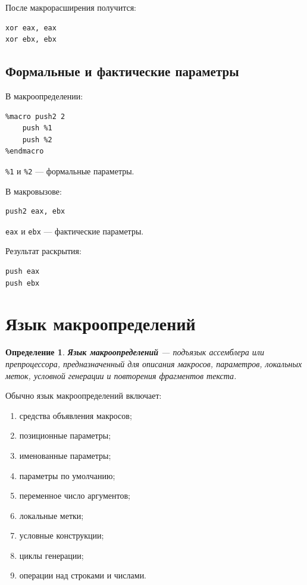 \documentclass[12pt,a4paper]{article}
\newtheorem{definition}{Определение}
\begin{document}
После макрорасширения получится:

\begin{lstlisting}
xor eax, eax
xor ebx, ebx
\end{lstlisting}

\subsection{Формальные и фактические параметры}

В макроопределении:

\begin{lstlisting}
%macro push2 2
    push %1
    push %2
%endmacro
\end{lstlisting}

\texttt{\%1} и \texttt{\%2} --- формальные параметры.

В макровызове:

\begin{lstlisting}
push2 eax, ebx
\end{lstlisting}

\texttt{eax} и \texttt{ebx} --- фактические параметры.

Результат раскрытия:

\begin{lstlisting}
push eax
push ebx
\end{lstlisting}

\section{Язык макроопределений}

\begin{definition}
\textbf{Язык макроопределений} --- подъязык ассемблера или препроцессора, предназначенный для описания макросов, параметров, локальных меток, условной генерации и повторения фрагментов текста.
\end{definition}

Обычно язык макроопределений включает:

\begin{enumerate}
    \item средства объявления макросов;
    \item позиционные параметры;
    \item именованные параметры;
    \item параметры по умолчанию;
    \item переменное число аргументов;
    \item локальные метки;
    \item условные конструкции;
    \item циклы генерации;
    \item операции над строками и числами.
\end{enumerate}
\end{document}
